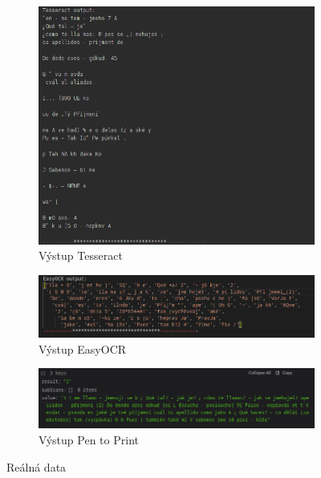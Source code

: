 \documentclass[journal]{IEEEtran}
\begin{document}
\begin{figure}

\begin{subfigure}{\linewidth}
        \centering
        \includegraphics[width=\linewidth]{Images/Tesseract_Page1.png}
        \caption{Výstup Tesseract}
        \label{fig:Tesseract_Test}
\end{subfigure}

\begin{subfigure}{\linewidth}
        \centering
        \includegraphics[width=\linewidth]{Images/easyOCR_Page1.png}
        \caption{Výstup EasyOCR}
        \label{fig:easyOCR_Test}
\end{subfigure}

\begin{subfigure}{\linewidth}
        \centering
        \includegraphics[width=\linewidth]{Images/penToPrint_RealDataAdjusted.png}
        \caption{Výstup Pen to Print}
        \label{fig:penToPrint_Test}
\end{subfigure}
\caption{Reálná data}

\end{figure}
\end{document}

